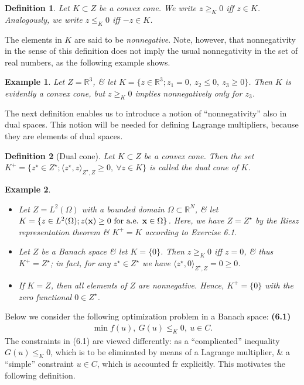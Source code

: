 \documentclass[oneside]{book}
\numberwithin{equation}{section}
\newtheorem{definition}{Definition}[chapter]
\newtheorem{example}{Example}[chapter]
\begin{document}
\begin{definition}
	Let $K\subset Z$ be a convex cone. We write $z\ge_K 0$ iff $z\in K$. Analogously, we write $z\le_K 0$ iff $-z\in K$.
\end{definition}
The elements in $K$ are said to be \textit{nonnegative}. Note, however, that nonnegativity in the sense of this definition does not imply the usual nonnegativity in the set of real numbers, as the following example shows.

\begin{example}
	Let $Z = \mathbb{R}^3$, \& let $K = \{z\in\mathbb{R}^3;z_1 = 0,\ z_2\le 0,\ z_3\ge 0\}$. Then $K$ is evidently a convex cone, but $z\ge_K 0$ implies nonnegatively only for $z_3$.
\end{example}
The next definition enables us to introduce a notion of ``nonnegativity'' also in dual spaces. This notion will be needed for defining Lagrange multipliers, because they are elements of dual spaces.

\begin{definition}[Dual cone]
	Let $K\subset Z$ be a convex cone. Then the set $K^+ = \{z^\star\in Z^\star;\langle z^\star,z\rangle_{Z^\star,Z}\ge 0,\ \forall z\in K\}$ is called the \emph{dual cone} of $K$.
\end{definition}

\begin{example}
	\begin{itemize}
		\item[(i)] Let $Z = L^2(\Omega)$ with a bounded domain $\Omega\subset\mathbb{R}^N$, \& let $K = \{z\in L^2(\Omega);z({\bf x})\ge 0\mbox{ for a.e. }{\bf x}\in\Omega\}$. Here, we have $Z = Z^\star$ by the Riesz representation theorem \& $K^+ = K$ according to Exercise 6.1.
		\item[(ii)] Let $Z$ be a Banach space \& let $K = \{0\}$. Then $z\ge_K 0$ iff $z = 0$, \& thus $K^+ = Z^\star$; in fact, for any $z^\star\in Z^\star$ we have $\langle z^\star,0\rangle_{Z^\star,Z} = 0\ge 0$.
		\item[(iii)] If $K = Z$, then all elements of $Z$ are nonnegative. Hence, $K^+ = \{0\}$ with the zero functional $0\in Z^\star$.
	\end{itemize}
\end{example}
Below we consider the following optimization problem in a Banach space: \textbf{(6.1)}
\begin{align*}
	\min f(u),\ G(u)\le_K 0,\ u\in C.
\end{align*}
The constraints in (6.1) are viewed differently: as a ``complicated'' inequality $G(u)\le_K 0$, which is to be eliminated by means of a Lagrange multiplier, \& a ``simple'' constraint $u\in C$, which is accounted fr explicitly. This motivates the following definition.
\end{document}
